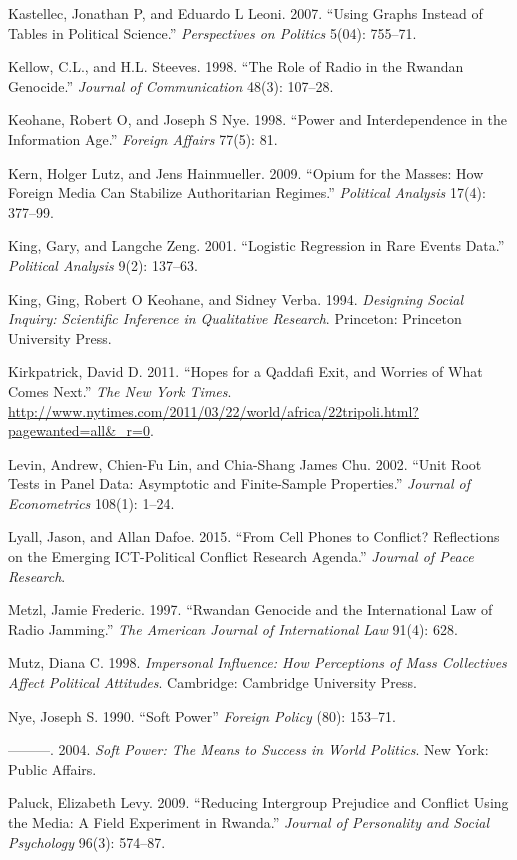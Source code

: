 \documentclass[12pt,article,oneside]{memoir}
\begin{document}
Kastellec, Jonathan P, and Eduardo L Leoni. 2007. ``Using Graphs Instead
of Tables in Political Science.'' \emph{Perspectives on Politics} 5(04):
755--71.

Kellow, C.L., and H.L. Steeves. 1998. ``The Role of Radio in the Rwandan
Genocide.'' \emph{Journal of Communication} 48(3): 107--28.

Keohane, Robert O, and Joseph S Nye. 1998. ``Power and Interdependence
in the Information Age.'' \emph{Foreign Affairs} 77(5): 81.

Kern, Holger Lutz, and Jens Hainmueller. 2009. ``Opium for the Masses:
How Foreign Media Can Stabilize Authoritarian Regimes.'' \emph{Political
Analysis} 17(4): 377--99.

King, Gary, and Langche Zeng. 2001. ``Logistic Regression in Rare Events
Data.'' \emph{Political Analysis} 9(2): 137--63.

King, Ging, Robert O Keohane, and Sidney Verba. 1994. \emph{Designing
Social Inquiry: Scientific Inference in Qualitative Research}.
Princeton: Princeton University Press.

Kirkpatrick, David D. 2011. ``Hopes for a Qaddafi Exit, and Worries of
What Comes Next.'' \emph{The New York Times}.
\url{http://www.nytimes.com/2011/03/22/world/africa/22tripoli.html?pagewanted=all\&_r=0}.

Levin, Andrew, Chien-Fu Lin, and Chia-Shang James Chu. 2002. ``Unit Root
Tests in Panel Data: Asymptotic and Finite-Sample Properties.''
\emph{Journal of Econometrics} 108(1): 1--24.

Lyall, Jason, and Allan Dafoe. 2015. ``From Cell Phones to Conflict?
Reflections on the Emerging ICT-Political Conflict Research Agenda.''
\emph{Journal of Peace Research}.

Metzl, Jamie Frederic. 1997. ``Rwandan Genocide and the International
Law of Radio Jamming.'' \emph{The American Journal of International Law}
91(4): 628.

Mutz, Diana C. 1998. \emph{Impersonal Influence: How Perceptions of Mass
Collectives Affect Political Attitudes}. Cambridge: Cambridge University
Press.

Nye, Joseph S. 1990. ``Soft Power'' \emph{Foreign Policy} (80): 153--71.

---------. 2004. \emph{Soft Power: The Means to Success in World
Politics}. New York: Public Affairs.

Paluck, Elizabeth Levy. 2009. ``Reducing Intergroup Prejudice and
Conflict Using the Media: A Field Experiment in Rwanda.'' \emph{Journal
of Personality and Social Psychology} 96(3): 574--87.
\end{document}
